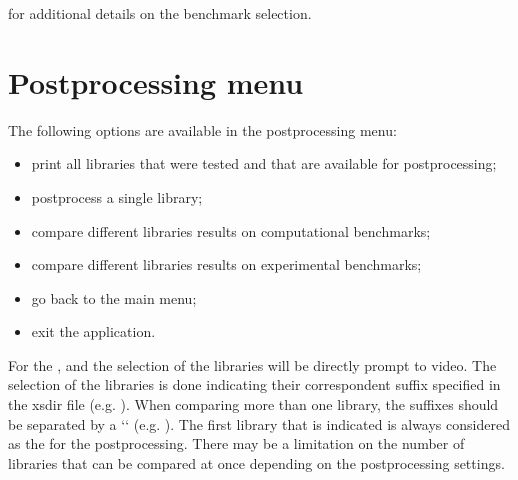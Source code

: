 \documentclass[letterpaper,10pt,english]{sphinxmanual}
\let\sphinxpxdimen\pdfpxdimen\else\newdimen\sphinxpxdimen
\begin{document}


{\hyperref[\detokenize{usage/configuration:config}]{}} for additional details on the benchmark selection.




\section{Post\sphinxhyphen{}processing menu}
\label{\detokenize{usage/menu:post-processing-menu}}\label{\detokenize{usage/menu:postmenu}}
\noindent\sphinxincludegraphics[width=400\sphinxpxdimen]{{postmenu}.png}

The following options are available in the post\sphinxhyphen{}processing menu:
\begin{itemize}
\item {} 
 print all libraries that were tested and that are available for post\sphinxhyphen{}processing;

\item {} 
 post\sphinxhyphen{}process a single library;

\item {} 
 compare different libraries results on computational benchmarks;

\item {} 
 compare different libraries results on experimental benchmarks;

\item {} 
 go back to the main menu;

\item {} 
 exit the application.

\end{itemize}

For the ,  and  the selection of the libraries will be directly prompt to video.
The selection of the libraries is done indicating their correspondent suffix specified in the xsdir file
(e.g. ). When comparing more than one library, the suffixes should be separated by a ‘\sphinxhyphen{}‘ (e.g. ).
The first library that is indicated is always considered as the  for the post\sphinxhyphen{}processing.
There may be a limitation on the number of libraries that can be compared at once depending on the post\sphinxhyphen{}processing settings.
\end{document}
